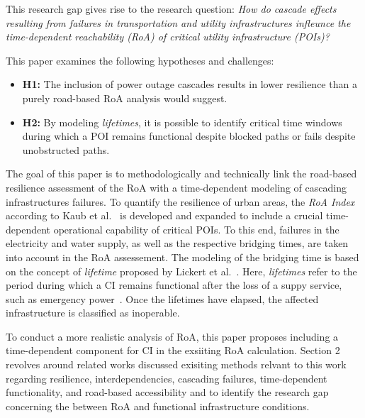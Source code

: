 


This research gap gives rise to the research question: \textit{How do cascade effects resulting from failures in transportation and utility infrastructures infleunce the time-dependent reachability (RoA) of critical utility infrastructure (POIs)?}

This paper examines the following hypotheses and challenges:
\begin{itemize}
    \item \textbf{H1:} The inclusion of power outage cascades results in lower resilience than a purely road-based RoA analysis would suggest.
    \item \textbf{H2:} By modeling \textit{lifetimes}, it is possible to identify critical time windows during which a POI remains functional despite blocked paths or fails despite unobstructed paths.
\end{itemize}




The goal of this paper is to methodologically and technically link the road-based resilience assessment of the RoA with a time-dependent modeling of cascading infrastructures failures.
To quantify the resilience of urban areas, the \textit{RoA Index} according to Kaub et al.~\cite{kaub2024} is developed and expanded to include a crucial time-dependent operational capability of critical POIs. To this end, failures in the electricity and water supply, as well as the respective bridging times, are taken into account in the RoA assessement. The modeling of the bridging time is based on the concept of \textit{lifetime} proposed by Lickert et al.~\cite{lickert2024}. Here, \textit{lifetimes} refer to the period during which a CI remains functional after the loss of a suppy service, such as emergency power~\cite{lickert2024}. Once the lifetimes have elapsed, the affected infrastructure is classified as inoperable.



To conduct a more realistic analysis of RoA, this paper proposes including a time-dependent component for CI in the exsiiting RoA calculation. Section 2 revolves around related works discussed exisiting methods relvant to this work regarding resilience, interdependencies, cascading failures, time-dependent functionality, and road-based accessibility and to identify the research gap concerning the between RoA and functional infrastructure conditions.


